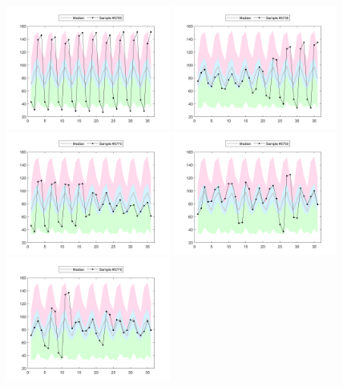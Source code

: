 \documentclass[12pt]{article}
\begin{document}
\begin{figure}
\centering
\includegraphics[width=0.48\textwidth]{outlier5785}
\includegraphics[width=0.48\textwidth]{outlier5736}
\includegraphics[width=0.48\textwidth]{outlier5770}
\includegraphics[width=0.48\textwidth]{outlier5750}
\includegraphics[width=0.48\textwidth]{outlier5778}

\end{figure}
\end{document}
